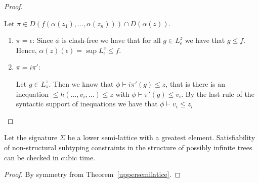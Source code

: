 \begin{proof}
\begin{enumerate}
Let $\pi \in D(f(\alpha(z_1),\ldots,\alpha(z_n))) \cap
D(\alpha(z))$.
\begin{enumerate}

\item $\pi=\epsilon$:
Since $\phi$ is clash-free we have that for all $g \in L^z_\epsilon$
we have that $g\leq f$. Hence, $\alpha(z)(\epsilon) = \sup
L^z_\epsilon \leq f$.

\item $\pi = i\pi'$:
  
  Let $g\in L^z_\pi$. Then we know that $\phi \vdash i\pi'(g) \leq z$,
  that is there is an inequation $\leq h(\ldots,v_i,\ldots)\leq z$ with
  $\phi \vdash \pi'(g) \leq v_i$. By the last rule of the syntactic
  support of inequations we have that $\phi \vdash v_i \leq z_i$

\end{enumerate}

\end{enumerate}
\end{proof}

\begin{corr}
\label{lowersemilattice}
Let the signature $\Sigma$ be a lower semi-lattice with a greatest
element. Satisfiability of non-structural subtyping constraints in the
structure of possibly infinite trees can be checked in cubic time.
\end{corr}

\begin{proof}
By symmetry from Theorem~\ref{uppersemilatice}.
\end{proof}

